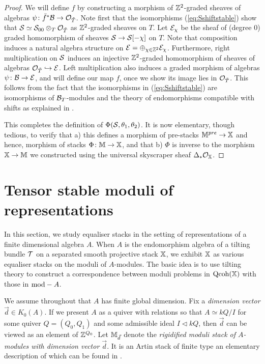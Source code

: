 \documentclass[12pt]{amsart}
\begin{document}
\begin{proof}
We will define $f$ by constructing a morphism of $\mathbb{Z}^2$-graded sheaves of algebras $\psi \colon \bar{f}^* \mathcal{B} \to \mathcal{O}_{\tilde{T}}$. Note first that the isomorphisms (\ref{eq:Sshiftstable}) show that 
$\mathcal{S} \simeq \mathcal{S}_{00} \otimes_T \mathcal{O}_{\tilde{T}}$ as $\mathbb{Z}^2$-graded sheaves on $T$. Let $\mathcal{E}_{\chi}$ be the sheaf of (degree 0) graded homomorphism of sheaves $\mathcal{S} \to \mathcal{S}[-\chi]$ on $T$. Note that composition induces a natural algebra structure on $\mathcal{E} =  \oplus_{\chi \in \mathbb{Z}^2} \mathcal{E}_{\chi}$. Furthermore, right multiplication on $\mathcal{S}$ induces an injective  $\mathbb{Z}^2$-graded homomorphism of sheaves of algebras $\mathcal{O}_{\tilde{T}} \hookrightarrow \mathcal{E}$. Left multiplication also induces a graded morphism of algebras $\psi \colon \mathcal{B} \to \mathcal{E}$, and will define our map $f$, once we show its image lies in $\mathcal{O}_{\tilde{T}}$. This follows from the fact that the isomorphisms in (\ref{eq:Sshiftstable}) are isomorphisms of $\mathcal{B}_T$-modules and the theory of endomorphisms compatible with shifts as explained in \cite[Section~3]{C12}. 

This completes the definition of $\Phi(\mathcal{S}, \theta_1,\theta_2)$. It is now elementary, though tedious, to verify that a) this defines a morphism of pre-stacks $\mathbb{M}^{pre} \to \mathbb{X}$ and hence, morphism of stacks $\Phi \colon \mathbb{M} \to \mathbb{X}$, and that b) $\Phi$ is inverse to the morphism $\mathbb{X} \to \mathbb{M}$ we constructed using the universal skyscraper sheaf $\Delta_* \mathcal{O}_{\mathbb{X}}$. 
\end{proof}

\section{Tensor stable moduli of representations}\label{sc:tensor_stable}

In this section, we study equaliser stacks in the setting of representations of a finite dimensional algebra $A$. When $A$ is the endomorphism algebra of a tilting bundle $\mathcal{T}$ on a separated smooth projective stack $\mathbb{X}$, we exhibit $\mathbb{X}$ as various equaliser stacks on the moduli of $A$-modules. The basic idea is to use tilting theory to construct a correspondence between moduli problems in $\operatorname{Qcoh}(\mathbb{X})$ with those in $\textup{mod}-A$.

We assume throughout that $A$ has finite global dimension. Fix a {\em dimension vector} $\vec{d} \in K_0(A)$. If we present $A$ as a quiver with relations so that $A \simeq kQ/I$ for some quiver $Q = (Q_0,Q_1)$ and some admissible ideal $I\triangleleft kQ$, then $\vec{d}$ can be viewed as an element of $\mathbb{Z}^{Q_0}$. Let $\mathbb{M}_{\vec{d}}$ denote the {\em rigidified moduli stack of $A$-modules with dimension vector $\vec{d}$}. It is an Artin stack of finite type an elementary description of which can be found in \cite[Section~2]{CL}.
\end{document}
